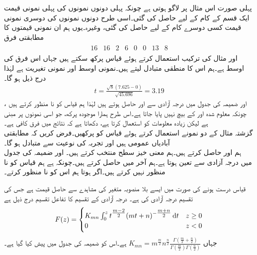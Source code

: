 پہلی صورت اس مثال پر لاگو ہوتی ہے چونکہ پہلی دونوں نمونوں کی پہلی نمونی قیمت ایک قسم کے کام کے لیے حاصل کی گئی۔اسی طرح دونوں نمونوں کی دوسری نمونی قیمت کسی دوسرے کام کے لیے حاصل کی گئی، وغیرہ۔یوں ہم ان نمونی قیمتوں کا مطابقتی فرق
\begin{align*}
\begin{array}{rrrrrrrr}
16&16&2&6&0&0&13&8
\end{array}
\end{align*}
اور مثال  کی ترکیب استعمال کرتے ہوئے قیاس  پرکھ سکتے ہیں جہاں  اس فرق کی اوسط ہے۔ہم اس کا منطقی متبادل  لیتے ہیں۔نمونی اوسط  اور نمونی تغیریت  ہے لہٰذا درج ذیل ہو گا۔
\begin{align*}
t=\frac{\sqrt{8}(7.625-0)}{\sqrt{45.696}}=3.19
\end{align*}
،  اور ضمیمہ  کی جدول  میں  درجہ آزادی سے  اور  حاصل ہوتے ہیں لہٰذا ہم قیاس کو نا منظور کرتے ہیں چونکہ  معلوم شدہ  اور  کے بیچ نہیں پایا جاتا ہے۔اس طرح ہمارا موجودہ پرکھ، جو اسی نمونوں پر مبنی ہے لیکن زیادہ معلومات کو استعمال کرتا ہے، دکھاتا ہے کہ نتائج میں فرق کافی ہے۔ 
\quad {}\\
گزشتہ مثال کے دو نمونے استعمال کرتے ہوئے قیاس کو پرکھیں۔فرض کریں کہ مطابقتی آبادیاں عمومی ہیں اور تجربہ کی نوعیت سے متبادل  ہو گا۔\\
\quad
ہم  اور  حاصل کرتے ہیں۔ہم معنی خیز سطح  منتخب کرتے ہیں۔ اور ضمیمہ  کی جدول  میں  درجہ آزادی  سے  تعین ہوتا ہے۔ہم آخر میں  حاصل کرتے ہیں۔چونکہ  ہے ہم قیاس کو نا منظور نہیں کرتے ہیں۔اگر  ہوتا ہم اس کو نا منظور کرتے۔

قیاس درست ہونے کی صورت میں  ایسے بلا منصوبہ متغیر کی مشاہدے سے حاصل قیمت ہے جس کی تقسیم درجہ آزادی  کی   ہے۔   درجہ آزادی کے  تقسیم کا تفاعل تقسیم درج ذیل ہے
\begin{align}\label{مساوات_شماریات_ایف_تقسیم}
F(z)=
\begin{cases}
K_{mn}\int_{0}^{z} t^{\tfrac{m-2}{2}} (mt+n)^{-\tfrac{m+n}{2}}\dif t& z\ge 0\\
0&z<0
\end{cases}
\end{align}
جہاں 
$K_{mn}=m^{\tfrac{m}{2}}n^{\tfrac{n}{2}}\tfrac{\Gamma(\tfrac{m}{2}+\tfrac{n}{2})}{\Gamma(\tfrac{m}{2})\Gamma(\tfrac{n}{2})}$
ہے۔اس کو ضمیمہ  کی جدول  میں پیش کیا گیا ہے۔

